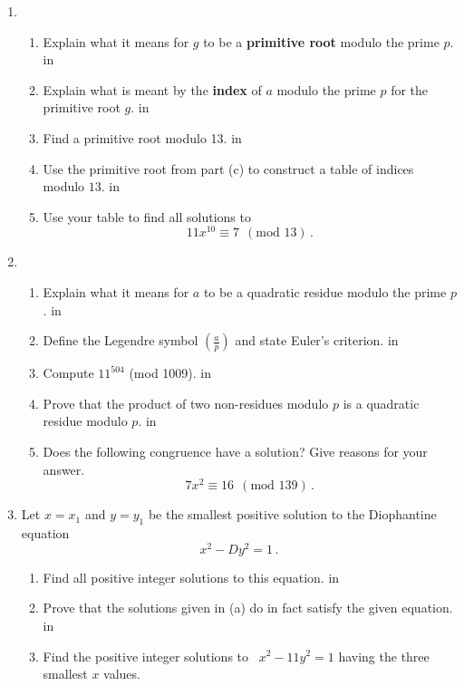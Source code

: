 \documentclass[12pt]{article}
\newcommand{\rmp}{\reversemarginpar\marginpar}
\begin{document}
\begin{enumerate}
\newpage
\item
    \begin{enumerate}
      \item  Explain \rmp{[16]}what it means for $g$ to be a {\bf primitive
             root} modulo the prime $p$.
 in
      \item  Explain what is meant by the {\bf index} of $a$ modulo the prime $p$ for the
             primitive root $g$.
 in
      \item  Find a primitive root modulo 13.
 in
      \item  Use the primitive root from part (c) to construct a table of indices
             modulo $13$.
 in
      \item  Use your table to find all solutions to
             $$
                  11 x^{10} \equiv 7\ \ (\textrm{mod } 13)\, .
             $$
    \end{enumerate}

\newpage
\item
    \begin{enumerate}
    \item Explain \rmp{[20]}what it means for $a$ to be a quadratic residue
          modulo the prime $p$.
 in
                \item Define the Legendre symbol
$\displaystyle{\left(\frac{a}{p}\right)}$ and state Euler's criterion.
 in
    \item Compute $11^{504}$
          (mod 1009).
 in
    \item Prove that the product of two non-residues modulo $p$ is a quadratic residue
          modulo $p$.
 in
    \item Does the following congruence have a solution? Give reasons for your answer.
             $$
                  7 x^{2} \equiv 16 \ \ (\textrm{mod } 139)\, .
             $$
    \end{enumerate}



\newpage
\item
       Let \rmp{[12]} $x=x_1$ and $y=y_1$ be the smallest
       positive solution to the Diophantine equation
       $$
             x^2 - D y^2 = 1\, .
       $$
    \begin{enumerate}
    \item Find all positive integer solutions to this equation.
 in
    \item Prove that the solutions given in (a) do in fact satisfy the given equation.
 in
    \item Find the positive integer solutions to \ $x^2 - 11 y^2 = 1$ having the three
          smallest $x$ values.
    \end{enumerate}


\end{enumerate}
\end{document}
